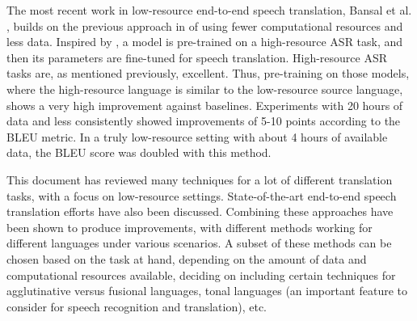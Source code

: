 \documentclass{article}
\begin{document}
The most recent work in low-resource end-to-end speech translation, Bansal et al. \cite{Bansal:19}, builds on the previous approach in \cite{Bansal:18} of using fewer computational resources and less data. Inspired by \cite{Zoph:16}, a model is pre-trained on a high-resource ASR task, and then its parameters are fine-tuned for speech translation. High-resource ASR tasks are, as mentioned previously, excellent. Thus, pre-training on those models, where the high-resource language is similar to the low-resource source language, shows a very high improvement against baselines. Experiments with 20 hours of data and less consistently showed improvements of 5-10 points according to the BLEU metric. In a truly low-resource setting with about 4 hours of available data, the BLEU score was doubled with this method. \medskip

This document has reviewed many techniques for a lot of different translation tasks, with a focus on low-resource settings. State-of-the-art end-to-end speech translation efforts have also been discussed. Combining these approaches have been shown to produce improvements, with different methods working for different languages under various scenarios. A subset of these methods can be chosen based on the task at hand, depending on the amount of data and computational resources available, deciding on including certain techniques for agglutinative versus fusional languages, tonal languages (an important feature to consider for speech recognition and translation), etc. \clearpage

\nocite{*}



\end{document}
